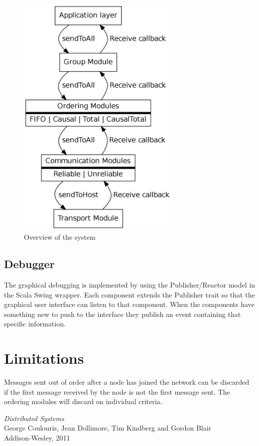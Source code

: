 \documentclass[10pt, oneside]{article}
\begin{document}
\begin{figure}[h]
\centering
\includegraphics[height=12cm]{graph2}
\caption{Overview of the system}
\label{fig:modules}
\end{figure}


\subsection{Debugger}

The graphical debugging is implemented by using the Publisher/Reactor model in
the Scala Swing wrapper. Each component extends the Publisher trait so that the
graphical user interface can listen to that component. When the components have
something new to push to the interface they publish an event containing that
specific information. 

\section{Limitations}

Messages sent out of order after a node has joined the network can be discarded
if the first message received by the node is not the first message sent. The
ordering modules will discard on individual criteria.

\pagebreak

\begin{thebibliography}{9}

 \emph{Distributed Systems}\\
\newblock George Coulouris, Jean Dollimore, Tim Kindberg and Gordon Blair\\
\newblock Addison-Wesley, 2011\\

\end{thebibliography}
\end{document}
